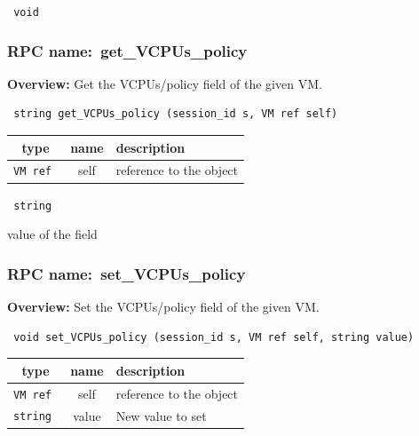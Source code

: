 \vspace{0.3cm}

{\tt 
void
}



\vspace{0.3cm}
\vspace{0.3cm}
\vspace{0.3cm}
\subsubsection{RPC name:~get\_VCPUs\_policy}

{\bf Overview:} 
Get the VCPUs/policy field of the given VM.

\begin{verbatim} string get_VCPUs_policy (session_id s, VM ref self)\end{verbatim}



 
\vspace{0.3cm}
\begin{tabular}{|c|c|p{7cm}|}
 \hline
{\bf type} & {\bf name} & {\bf description} \\ \hline
{\tt VM ref } & self & reference to the object \\ \hline 

\end{tabular}

\vspace{0.3cm}

{\tt 
string
}


value of the field
\vspace{0.3cm}
\vspace{0.3cm}
\vspace{0.3cm}
\subsubsection{RPC name:~set\_VCPUs\_policy}

{\bf Overview:} 
Set the VCPUs/policy field of the given VM.

\begin{verbatim} void set_VCPUs_policy (session_id s, VM ref self, string value)\end{verbatim}



 
\vspace{0.3cm}
\begin{tabular}{|c|c|p{7cm}|}
 \hline
{\bf type} & {\bf name} & {\bf description} \\ \hline
{\tt VM ref } & self & reference to the object \\ \hline 

{\tt string } & value & New value to set \\ \hline 

\end{tabular}

